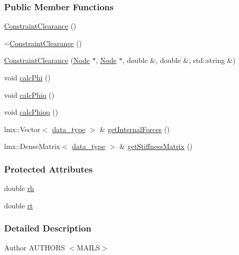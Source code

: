 \subsubsection*{Public Member Functions}
\begin{DoxyCompactItemize}
\item 
\hyperlink{classmknix_1_1_constraint_clearance_ad240e0d99967997aa4c2a5697aa4cb94}{Constraint\-Clearance} ()
\item 
\hyperlink{classmknix_1_1_constraint_clearance_a1db613ec74403b647fbeb68c91510c50}{$\sim$\-Constraint\-Clearance} ()
\item 
\hyperlink{classmknix_1_1_constraint_clearance_afcf63dc9c275d3ca6c55d072b2b554a2}{Constraint\-Clearance} (\hyperlink{classmknix_1_1_node}{Node} $\ast$, \hyperlink{classmknix_1_1_node}{Node} $\ast$, double \&, double \&, std\-::string \&)
\item 
void \hyperlink{classmknix_1_1_constraint_clearance_adeab95be15eee6fe28f09fafd4f5757a}{calc\-Phi} ()
\item 
void \hyperlink{classmknix_1_1_constraint_clearance_a7e834e62ef642f4f5207f3021f11020e}{calc\-Phiq} ()
\item 
void \hyperlink{classmknix_1_1_constraint_clearance_aea75fa1da7455bbefb5ce7705a16a3cc}{calc\-Phiqq} ()
\item 
lmx\-::\-Vector$<$ \hyperlink{namespacemknix_a16be4b246fbf2cceb141e3a179111020}{data\-\_\-type} $>$ \& \hyperlink{classmknix_1_1_constraint_clearance_ac190c9f0a3b0851681c6be643cb385ac}{get\-Internal\-Forces} ()
\item 
lmx\-::\-Dense\-Matrix$<$ \hyperlink{namespacemknix_a16be4b246fbf2cceb141e3a179111020}{data\-\_\-type} $>$ \& \hyperlink{classmknix_1_1_constraint_clearance_a40ac23ffea02a1a45e4b084bcd807a51}{get\-Stiffness\-Matrix} ()
\end{DoxyCompactItemize}
\subsubsection*{Protected Attributes}
\begin{DoxyCompactItemize}
\item 
double \hyperlink{classmknix_1_1_constraint_clearance_ad4bba99aa716d1f15bd9dc613f0352e8}{rh}
\item 
double \hyperlink{classmknix_1_1_constraint_clearance_a07e6a50d3416e2265e2dadb1bf730c43}{rt}
\end{DoxyCompactItemize}


\subsubsection{Detailed Description}
\begin{DoxyAuthor}{Author}
A\-U\-T\-H\-O\-R\-S $<$\-M\-A\-I\-L\-S$>$ 
\end{DoxyAuthor}


